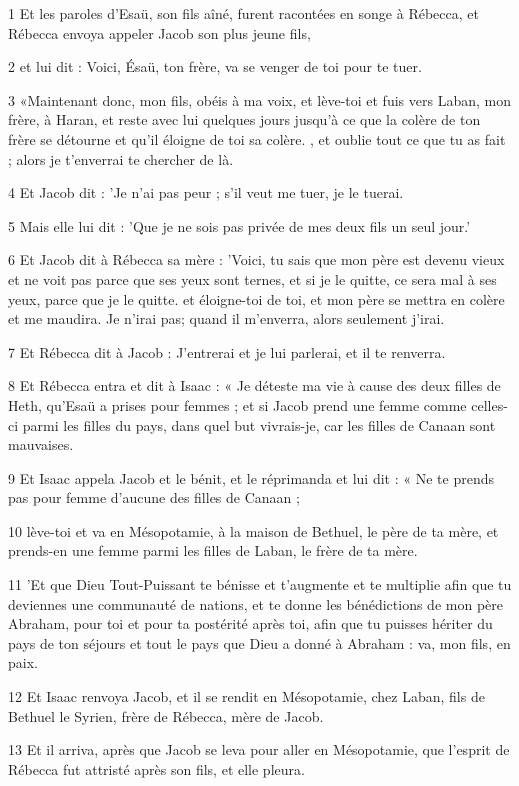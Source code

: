 \par 1 Et les paroles d'Esaü, son fils aîné, furent racontées en songe à Rébecca, et Rébecca envoya appeler Jacob son plus jeune fils,
\par 2 et lui dit : Voici, Ésaü, ton frère, va se venger de toi pour te tuer.
\par 3 «Maintenant donc, mon fils, obéis à ma voix, et lève-toi et fuis vers Laban, mon frère, à Haran, et reste avec lui quelques jours jusqu'à ce que la colère de ton frère se détourne et qu'il éloigne de toi sa colère. , et oublie tout ce que tu as fait ; alors je t'enverrai te chercher de là.
\par 4 Et Jacob dit : 'Je n'ai pas peur ; s'il veut me tuer, je le tuerai.
\par 5 Mais elle lui dit : 'Que je ne sois pas privée de mes deux fils un seul jour.'
\par 6 Et Jacob dit à Rébecca sa mère : 'Voici, tu sais que mon père est devenu vieux et ne voit pas parce que ses yeux sont ternes, et si je le quitte, ce sera mal à ses yeux, parce que je le quitte. et éloigne-toi de toi, et mon père se mettra en colère et me maudira. Je n'irai pas; quand il m’enverra, alors seulement j’irai.
\par 7 Et Rébecca dit à Jacob : J'entrerai et je lui parlerai, et il te renverra.
\par 8 Et Rébecca entra et dit à Isaac : « Je déteste ma vie à cause des deux filles de Heth, qu'Esaü a prises pour femmes ; et si Jacob prend une femme comme celles-ci parmi les filles du pays, dans quel but vivrais-je, car les filles de Canaan sont mauvaises.
\par 9 Et Isaac appela Jacob et le bénit, et le réprimanda et lui dit : « Ne te prends pas pour femme d'aucune des filles de Canaan ;
\par 10 lève-toi et va en Mésopotamie, à la maison de Bethuel, le père de ta mère, et prends-en une femme parmi les filles de Laban, le frère de ta mère.
\par 11 'Et que Dieu Tout-Puissant te bénisse et t'augmente et te multiplie afin que tu deviennes une communauté de nations, et te donne les bénédictions de mon père Abraham, pour toi et pour ta postérité après toi, afin que tu puisses hériter du pays de ton séjours et tout le pays que Dieu a donné à Abraham : va, mon fils, en paix.
\par 12 Et Isaac renvoya Jacob, et il se rendit en Mésopotamie, chez Laban, fils de Bethuel le Syrien, frère de Rébecca, mère de Jacob.
\par 13 Et il arriva, après que Jacob se leva pour aller en Mésopotamie, que l'esprit de Rébecca fut attristé après son fils, et elle pleura.
